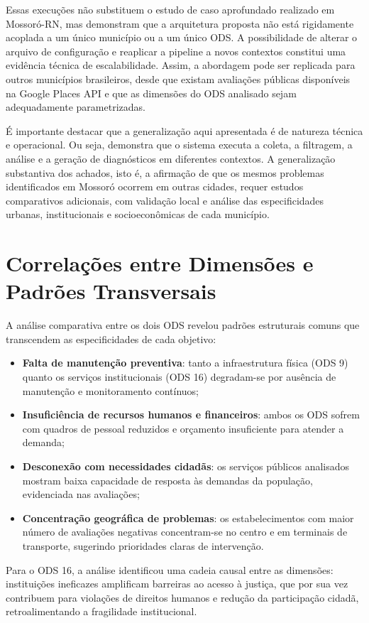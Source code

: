 Essas execuções não substituem o estudo de caso aprofundado realizado em Mossoró-RN, mas demonstram que a arquitetura proposta não está rigidamente acoplada a um único município ou a um único ODS. A possibilidade de alterar o arquivo de configuração e reaplicar a pipeline a novos contextos constitui uma evidência técnica de escalabilidade. Assim, a abordagem pode ser replicada para outros municípios brasileiros, desde que existam avaliações públicas disponíveis na Google Places API e que as dimensões do ODS analisado sejam adequadamente parametrizadas.

É importante destacar que a generalização aqui apresentada é de natureza técnica e operacional. Ou seja, demonstra que o sistema executa a coleta, a filtragem, a análise e a geração de diagnósticos em diferentes contextos. A generalização substantiva dos achados, isto é, a afirmação de que os mesmos problemas identificados em Mossoró ocorrem em outras cidades,  requer estudos comparativos adicionais, com validação local e análise das especificidades urbanas, institucionais e socioeconômicas de cada município.

\section{Correlações entre Dimensões e Padrões Transversais}
\label{sec:correlacoes}

A análise comparativa entre os dois ODS revelou padrões estruturais comuns que transcendem as especificidades de cada objetivo:

\begin{itemize}
    \item \textbf{Falta de manutenção preventiva}: tanto a infraestrutura física (ODS 9) quanto os serviços institucionais (ODS 16) degradam-se por ausência de manutenção e monitoramento contínuos;
    \item \textbf{Insuficiência de recursos humanos e financeiros}: ambos os ODS sofrem com quadros de pessoal reduzidos e orçamento insuficiente para atender a demanda;
    \item \textbf{Desconexão com necessidades cidadãs}: os serviços públicos analisados mostram baixa capacidade de resposta às demandas da população, evidenciada nas avaliações;
    \item \textbf{Concentração geográfica de problemas}: os estabelecimentos com maior número de avaliações negativas concentram-se no centro e em terminais de transporte, sugerindo prioridades claras de intervenção.
\end{itemize}

Para o ODS 16, a análise identificou uma cadeia causal entre as dimensões: instituições ineficazes amplificam barreiras ao acesso à justiça, que por sua vez contribuem para violações de direitos humanos e redução da participação cidadã, retroalimentando a fragilidade institucional.

